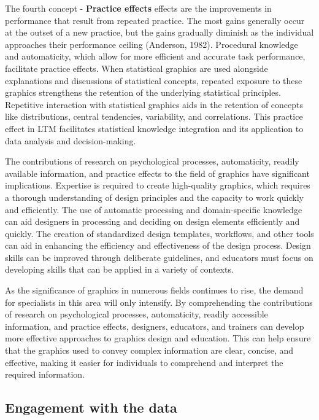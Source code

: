 \documentclass[print]{nuthesis}
\begin{document}
The fourth concept - \textbf{Practice effects} effects are the improvements in performance that result from repeated practice.
The most gains generally occur at the outset of a new practice, but the gains gradually diminish as the individual approaches their performance ceiling (Anderson, 1982).
Procedural knowledge and automaticity, which allow for more efficient and accurate task performance, facilitate practice effects.
When statistical graphics are used alongside explanations and discussions of statistical concepts, repeated exposure to these graphics strengthens the retention of the underlying statistical principles.
Repetitive interaction with statistical graphics aids in the retention of concepts like distributions, central tendencies, variability, and correlations.
This practice effect in LTM facilitates statistical knowledge integration and its application to data analysis and decision-making.

The contributions of research on psychological processes, automaticity, readily available information, and practice effects to the field of graphics have significant implications.
Expertise is required to create high-quality graphics, which requires a thorough understanding of design principles and the capacity to work quickly and efficiently.
The use of automatic processing and domain-specific knowledge can aid designers in processing and deciding on design elements efficiently and quickly.
The creation of standardized design templates, workflows, and other tools can aid in enhancing the efficiency and effectiveness of the design process.
Design skills can be improved through deliberate guidelines, and educators must focus on developing skills that can be applied in a variety of contexts.

As the significance of graphics in numerous fields continues to rise, the demand for specialists in this area will only intensify.
By comprehending the contributions of research on psychological processes, automaticity, readily accessible information, and practice effects, designers, educators, and trainers can develop more effective approaches to graphics design and education.
This can help ensure that the graphics used to convey complex information are clear, concise, and effective, making it easier for individuals to comprehend and interpret the required information.

\hypertarget{engagement-with-the-data}{%
\subsection{Engagement with the data}\label{engagement-with-the-data}}
\end{document}
